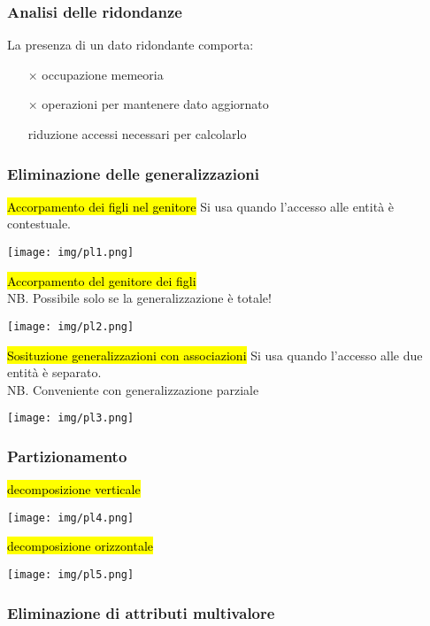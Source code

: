 \documentclass[a4paper]{article}
\begin{document}
\subsubsection{Analisi delle ridondanze}
La presenza di un dato ridondante comporta:
\begin{itemize}[noitemsep]
  \item[$\times$] occupazione memeoria
  \item[$\times$] operazioni per mantenere dato aggiornato
  \item[\checkmark] riduzione accessi necessari per calcolarlo
\end{itemize}\par \subsubsection{Eliminazione delle generalizzazioni}
\hl{Accorpamento dei figli nel genitore}
Si usa quando l'accesso alle entità è contestuale.
\begin{center}
      \texttt{[image: img/pl1.png]}
\end{center}\par \hl{Accorpamento del genitore dei figli}\\
NB. Possibile solo se la generalizzazione è totale!
\begin{center}
      \texttt{[image: img/pl2.png]}
\end{center}\par \hl{Sosituzione generalizzazioni con associazioni} Si usa quando l'accesso alle due entità è separato.
\\NB. Conveniente con generalizzazione parziale
\begin{center}
      \texttt{[image: img/pl3.png]}
\end{center}\par \subsubsection{Partizionamento}
\hl{decomposizione verticale}
\begin{center}
      \texttt{[image: img/pl4.png]}
\end{center}\par \hl{decomposizione orizzontale}
\begin{center}
      \texttt{[image: img/pl5.png]}
\end{center}\par \subsubsection{Eliminazione di attributi multivalore}
\end{document}
